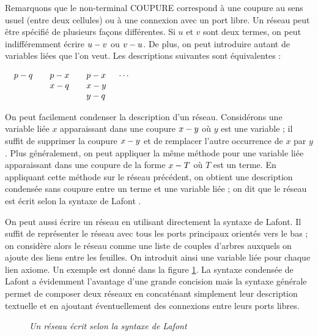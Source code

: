 Remarquons que le non-terminal \textsf{COUPURE} correspond \`a une
coupure au sens usuel (entre deux cellules) ou \`a une connexion avec
un port libre.
%
Un r\'eseau peut \^etre sp\'ecifi\'e de plusieurs fa\c cons diff\'erentes.
Si $u$ et $v$ sont deux termes, on peut indiff\'eremment
\'ecrire $u - v$ ou $v - u$. De plus, on peut introduire
autant de variables li\'ees que l'on veut. Les descriptions suivantes
sont \'equivalentes :

\begin{center}
$
\begin{array}{llll}
%
\begin{array}[t]{l}
p \connect q \\
\end{array}
%
&
%
\begin{array}[t]{l}
p \connect x \\
x \connect q
\end{array}
%
&
%
\begin{array}[t]{l}
p \connect x \\
x \connect y \\
y \connect q
\end{array}
%
&
\cdots
\end{array}
$
\end{center}

On peut facilement condenser la description d'un r\'eseau.
Consid\'erons une variable li\'ee $x$ apparaissant dans une
coupure \(x - y\) o\`u $y$ est une variable ;
il suffit de supprimer la coupure \(x - y\) et
de remplacer l'autre occurrence de $x$ par $y$.
%
Plus g\'en\'eralement, on peut appliquer la m\^eme m\'ethode pour une
variable li\'ee apparaissant dans une coupure de la forme
$x - T$ o\`u $T$ est un terme.
%
En appliquant cette m\'ethode sur le r\'eseau pr\'ec\'edent,
on obtient une description condens\'ee sans coupure entre un terme
et une variable li\'ee ; on dit que le r\'eseau est \'ecrit selon
la syntaxe de Lafont \cite{Laf90}.


On peut aussi \'ecrire un r\'eseau en utilisant directement la
syntaxe de Lafont. Il suffit de repr\'esenter le r\'eseau
avec tous les ports principaux orient\'es vers le bas ; on
consid\`ere alors le r\'eseau comme une liste de couples d'arbres
auxquels on ajoute des liens entre les feuilles.
On introduit ainsi une variable li\'ee pour chaque lien axiome.
Un exemple est donn\'e dans la figure \ref{lafont_syntax:fig}.
%
La syntaxe condens\'ee de Lafont a \'evidemment l'avantage d'une
grande concision mais la syntaxe g\'en\'erale permet de composer
deux r\'eseaux en concat\'enant simplement leur description textuelle
et en ajoutant \'eventuellement des connexions entre leurs ports
libres.


\begin{figure}
\caption{\textit{Un r\'eseau \'ecrit selon la syntaxe de Lafont}}
\label{lafont_syntax:fig}
\end{figure}






